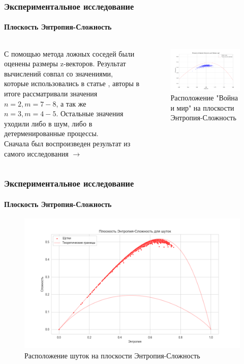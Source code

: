 \documentclass[aspectratio=169]{beamer}
\begin{document}
\begin{frame}
\frametitle{Экспериментальное исследование}
\framesubtitle{Плоскость Энтропия-Сложность}

	\begin{columns}
	 С помощью метода ложных соседей были оценены размеры z-векторов. Результат вычислений совпал со значениями, которые использовались в статье \cite{gromov_semantic_2023}, авторы в итоге рассматривали значения $n = 2, m = 7 - 8$, а так же $n = 3, m = 4 - 5$. Остальные значения уходили либо в шум, либо в детерменированные процессы. \\ Сначала был воспроизведен результат из самого исследования $\rightarrow$
	\begin{figure}[htbp]
            \centering
            \includegraphics[scale=0.26]{image3}
            \caption{Расположение "Война и мир" на плоскости Энтропия-Сложность}
            \label{fig:image3}
        \end{figure}
	\end{columns}
	
\end{frame}

\begin{frame}
\frametitle{Экспериментальное исследование}
\framesubtitle{Плоскость Энтропия-Сложность}
	
	\begin{figure}[htbp]
            \centering
            \includegraphics[scale=0.4]{image7}
            \caption{Расположение шуток на плоскости Энтропия-Сложность}
            \label{fig:image1}
        \end{figure}

\end{frame}
\end{document}
